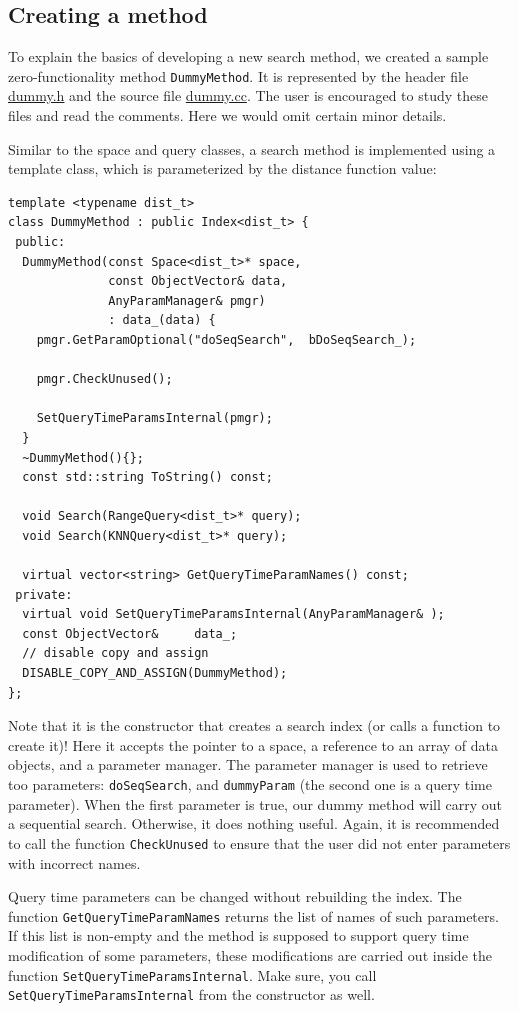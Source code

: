 \documentclass[runningheads,a4paper]{llncs}
\newcommand{\replocfile}{https://github.com/searchivarius/NonMetricSpaceLib/blob/develop/}
\newcommand{\ttt}[1]{\texttt{#1}}
\begin{document}
\subsection{Creating a method}\label{SectionCreateMethod}
To explain the basics of developing a new search method,
we created a sample zero-functionality method \ttt{DummyMethod}.
It is represented by 
the header file 
\href{\replocfile similarity_search/include/method/dummy.h}{dummy.h}
and the source file
\href{\replocfile similarity_search/src/method/dummy.cc}{dummy.cc}.
The user is encouraged to study these files and read the comments.
Here we would omit certain minor details.

Similar to the space and query classes, a search method is implemented using
a template class, which is parameterized by the distance function value:

\begin{verbatim}
template <typename dist_t>
class DummyMethod : public Index<dist_t> {
 public:
  DummyMethod(const Space<dist_t>* space, 
              const ObjectVector& data, 
              AnyParamManager& pmgr) 
              : data_(data) {
    pmgr.GetParamOptional("doSeqSearch",  bDoSeqSearch_);

    pmgr.CheckUnused();

    SetQueryTimeParamsInternal(pmgr);
  }
  ~DummyMethod(){};
  const std::string ToString() const;
   
  void Search(RangeQuery<dist_t>* query);
  void Search(KNNQuery<dist_t>* query);

  virtual vector<string> GetQueryTimeParamNames() const;
 private: 
  virtual void SetQueryTimeParamsInternal(AnyParamManager& );
  const ObjectVector&     data_;
  // disable copy and assign
  DISABLE_COPY_AND_ASSIGN(DummyMethod);
};
\end{verbatim}

Note that it is the constructor that creates a search index (or calls a function to create it)!
Here it accepts the pointer to a space,
a reference to an array of data objects, 
and a parameter manager.
The parameter manager is used to retrieve too parameters:
\ttt{doSeqSearch}, and \ttt{dummyParam} (the second one is a query time parameter).
When the first parameter is true, our dummy method will carry out a sequential search.
Otherwise, it does nothing useful.
Again, it is recommended to call the function \ttt{CheckUnused} to ensure
that the user did not enter parameters with incorrect names.

Query time parameters can be changed
without rebuilding the index.
The function \ttt{GetQueryTimeParamNames} returns the list of 
names of such parameters.
If this list is non-empty and the method is supposed to support
query time modification of some parameters,
these modifications are carried out inside the function  
\ttt{SetQueryTimeParamsInternal}.
Make sure, you call \ttt{SetQueryTimeParamsInternal} from the constructor as well.
\end{document}
